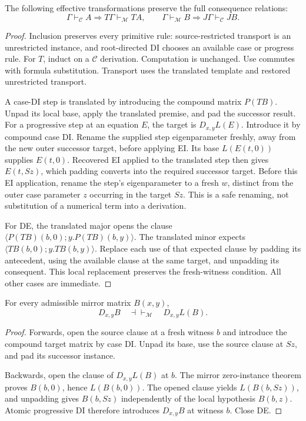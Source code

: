 \begin{theorem}\label{mir:translation-theorem}
The following effective transformations preserve the full consequence
relations:
\[
 \Gamma\vdash_{\mathcal C}A\Longrightarrow
 T\Gamma\vdash_{\mathcal M}TA,
 \qquad
 \Gamma\vdash_{\mathcal M}B\Longrightarrow
 J\Gamma\vdash_{\mathcal C}JB.
\]
\end{theorem}
\begin{proof}
Inclusion preserves every primitive rule: source-restricted transport
is an unrestricted instance, and root-directed DI chooses an available
case or progress rule. For $T$, induct on a $\mathcal C$ derivation.
Computation is unchanged. Use commutes with formula substitution.
Transport uses the translated template and restored unrestricted
transport.

A case-DI step is translated by introducing the compound matrix
$P(TB)$. Unpad its local base, apply the translated premise, and pad
the successor result. For a progressive step at an equation $E$,
the target is $D_{x,y}L(E)$. Introduce it by compound case DI.
Rename the supplied step eigenparameter freshly, away from the new
outer successor target, before applying EI.
Its base $L(E(t,0))$ supplies $E(t,0)$. Recovered EI applied to the
translated step then gives $E(t,Sz)$, which padding converts into
the required successor target. Before this EI application, rename
the step's eigenparameter to a fresh $w$, distinct from the outer
case parameter $z$ occurring in the target $Sz$. This is a safe
renaming, not substitution of a numerical term into a derivation.

For DE, the translated major opens the clause
$\langle P(TB)(b,0);y.P(TB)(b,y)\rangle$. The translated minor
expects $\langle TB(b,0);y.TB(b,y)\rangle$. Replace each use of
that expected clause by padding its antecedent, using the available
clause at the same target, and unpadding its consequent. This local
replacement preserves the fresh-witness condition. All other cases
are immediate.
\end{proof}

\begin{lemma}\label{mir:atomic-composite}
For every admissible mirror matrix $B(x,y)$,
\[
              D_{x,y}B\quad\dashv\vdash_{\mathcal M}\quad
              D_{x,y}L(B).
\]
\end{lemma}
\begin{proof}
Forwards, open the source clause at a fresh witness $b$ and introduce
the compound target matrix by case DI. Unpad its base, use the
source clause at $Sz$, and pad its successor instance.

Backwards, open the clause of $D_{x,y}L(B)$ at $b$. The mirror
zero-instance theorem proves $B(b,0)$, hence $L(B(b,0))$. The
opened clause yields $L(B(b,Sz))$, and unpadding gives $B(b,Sz)$
independently of the local hypothesis $B(b,z)$. Atomic progressive
DI therefore introduces $D_{x,y}B$ at witness $b$. Close DE.
\end{proof}

